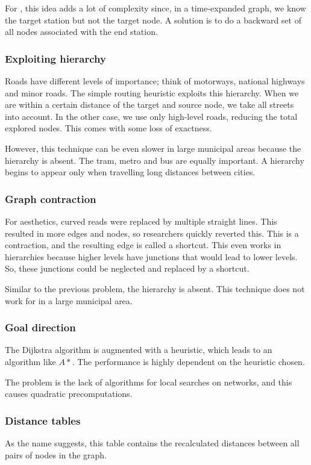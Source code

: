For , this idea adds a lot of complexity since, in a time-expanded graph, we know the target station but not the target node. A solution is to do a backward set of all nodes associated with the end station.
\subsubsection{Exploiting hierarchy}
Roads have different levels of importance; think of motorways, national highways and minor roads. The simple routing heuristic exploits this hierarchy. When we are within a certain distance of the target and source node, we take all streets into account. In the other case, we use only high-level roads, reducing the total explored nodes. This comes with some loss of exactness.

However, this technique can be even slower in large municipal areas because the hierarchy is absent. The tram, metro and bus are equally important. A hierarchy begins to appear only when travelling long distances between cities. 
\subsubsection{Graph contraction}
For aesthetics, curved reads were replaced by multiple straight lines. This resulted in more edges and nodes, so researchers quickly reverted this. This is a contraction, and the resulting edge is called a shortcut. This even works in hierarchies because higher levels have junctions that would lead to lower levels. So, these junctions could be neglected and replaced by a shortcut. 

Similar to the previous problem, the hierarchy is absent. This technique does not work for  in a large municipal area.
\subsubsection{Goal direction}
The Dijkstra algorithm is augmented with a heuristic, which leads to an algorithm like $ A*$. The performance is highly dependent on the heuristic chosen.

The problem is the lack of algorithms for local searches on  networks, and this causes quadratic precomputations.
\subsubsection{Distance tables}
As the name suggests, this table contains the recalculated distances between all pairs of nodes in the graph. 

